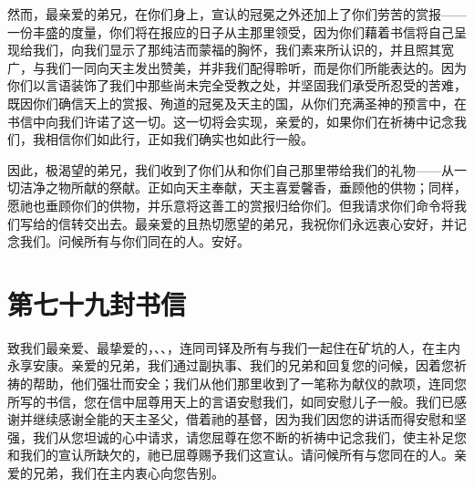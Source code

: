 然而，最亲爱的弟兄，在你们身上，宣认的冠冕之外还加上了你们劳苦的赏报——一份丰盛的度量，你们将在报应的日子从主那里领受，因为你们藉着书信将自己呈现给我们，向我们显示了那纯洁而蒙福的胸怀，我们素来所认识的，并且照其宽广，与我们一同向天主发出赞美，并非我们配得聆听，而是你们所能表达的。因为你们以言语装饰了我们中那些尚未完全受教之处，并坚固我们承受所忍受的苦难，既因你们确信天上的赏报、殉道的冠冕及天主的国，从你们充满圣神的预言中，在书信中向我们许诺了这一切。这一切将会实现，亲爱的，如果你们在祈祷中记念我们，我相信你们如此行，正如我们确实也如此行一般。\par

因此，极渴望的弟兄，我们收到了你们从和你们自己那里带给我们的礼物——从一切洁净之物所献的祭献。正如向天主奉献，天主喜爱馨香，垂顾他的供物；同样，愿祂也垂顾你们的供物，并乐意将这善工的赏报归给你们。但我请求你们命令将我们写给的信转交出去。最亲爱的且热切愿望的弟兄，我祝你们永远衷心安好，并记念我们。问候所有与你们同在的人。安好。\par



\section{第七十九封书信}

\par

\par

致我们最亲爱、最挚爱的，、、，连同司铎及所有与我们一起住在矿坑的人，在主内永享安康。亲爱的兄弟，我们通过副执事、我们的兄弟和回复您的问候，因着您祈祷的帮助，他们强壮而安全；我们从他们那里收到了一笔称为献仪的款项，连同您所写的书信，您在信中屈尊用天上的言语安慰我们，如同安慰儿子一般。我们已感谢并继续感谢全能的天主圣父，借着祂的基督，因为我们因您的讲话而得安慰和坚强，我们从您坦诚的心中请求，请您屈尊在您不断的祈祷中记念我们，使主补足您和我们的宣认所缺欠的，祂已屈尊赐予我们这宣认。请问候所有与您同在的人。亲爱的兄弟，我们在主内衷心向您告别。\par

